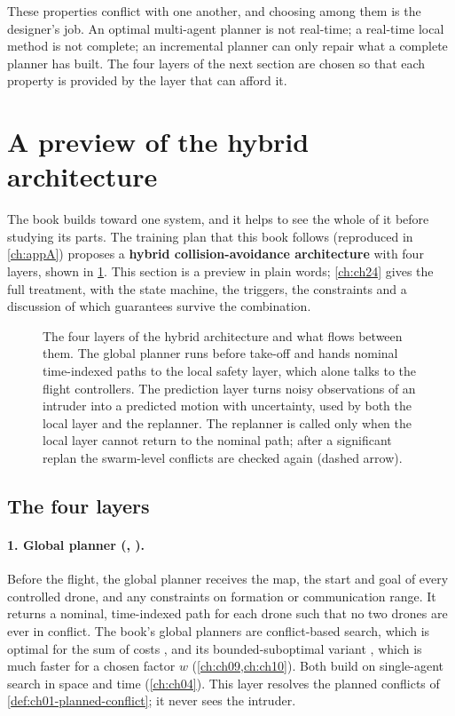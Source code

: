 These properties conflict with one another, and choosing among them is the designer's
job. An optimal multi-agent planner is not real-time; a real-time local method is not
complete; an incremental planner can only repair what a complete planner has built.
The four layers of the next section are chosen so that each property is provided by
the layer that can afford it.

\section{A preview of the hybrid architecture}
\label{sec:ch01-architecture}

The book builds toward one system, and it helps to see the whole of it before
studying its parts. The training plan that this book follows (reproduced in
\cref{ch:appA}) proposes a \textbf{hybrid collision-avoidance
architecture} with four layers, shown in
\cref{fig:ch01-architecture}. This section is a preview in plain words;
\cref{ch:ch24} gives the full treatment, with the state machine, the triggers, the
constraints and a discussion of which guarantees survive the combination.

\begin{figure}[tb]
  \centering
  \caption{The four layers of the hybrid architecture and what flows between them.
    The global planner runs before take-off and hands nominal time-indexed paths to
    the local safety layer, which alone talks to the flight controllers. The prediction
    layer turns noisy observations of an intruder into a predicted motion with
    uncertainty, used by both the local layer and the replanner. The replanner is
    called only when the local layer cannot return to the nominal path; after a
    significant replan the swarm-level conflicts are checked again (dashed arrow).}
  \label{fig:ch01-architecture}
\end{figure}

\subsection{The four layers}
\label{sec:ch01-layers}

\paragraph{1. Global planner (\cbs, \ecbs).}
Before the flight, the global planner receives the map, the start and goal of every
controlled drone, and any constraints on formation or communication range. It returns
a nominal, time-indexed path for each drone such that no two drones are ever in
conflict. The book's global planners are conflict-based search, which is
optimal for the sum of costs \cite{sharon2015cbs}, and its bounded-suboptimal variant \ecbs, which is much
faster for a chosen factor $w$ (\cref{ch:ch09,ch:ch10}). Both build on single-agent
search in space and time (\cref{ch:ch04}). This layer resolves the planned conflicts
of \cref{def:ch01-planned-conflict}; it never sees the intruder.

